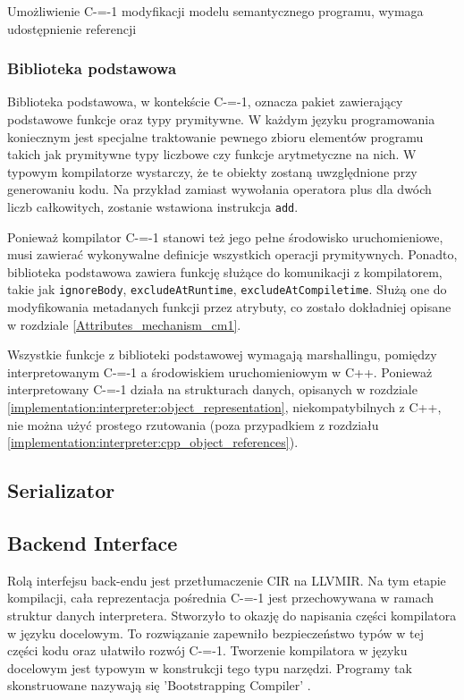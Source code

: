 Umożliwienie C-=-1 modyfikacji modelu semantycznego programu, wymaga udostępnienie referencji %

\subsubsection{Biblioteka podstawowa}
\label{implementation:interpreter:basic_library}

Biblioteka podstawowa, w kontekście C-=-1, oznacza pakiet zawierający podstawowe funkcje oraz typy prymitywne.
W każdym języku programowania koniecznym jest specjalne traktowanie pewnego zbioru elementów programu takich jak prymitywne typy liczbowe czy funkcje arytmetyczne na nich.
W typowym kompilatorze wystarczy, że te obiekty zostaną uwzględnione przy generowaniu kodu.
Na przykład zamiast wywołania operatora plus dla dwóch liczb całkowitych, zostanie wstawiona instrukcja \lstinline{add}.

Ponieważ kompilator C-=-1 stanowi też jego pełne środowisko uruchomieniowe, musi zawierać wykonywalne definicje wszystkich operacji prymitywnych.
Ponadto, biblioteka podstawowa zawiera funkcję służące do komunikacji z kompilatorem, takie jak \lstinline{ignoreBody}, \lstinline{excludeAtRuntime}, \lstinline{excludeAtCompiletime}.
Służą one do modyfikowania metadanych funkcji przez atrybuty, co zostało dokładniej opisane w rozdziale \ref{Attributes_mechanism_cm1}.

Wszystkie funkcje z biblioteki podstawowej wymagają marshallingu, pomiędzy interpretowanym C-=-1 a środowiskiem uruchomieniowym w C++.
Ponieważ interpretowany C-=-1 działa na strukturach danych, opisanych w rozdziale \ref{implementation:interpreter:object_representation}, niekompatybilnych z C++, nie można użyć prostego rzutowania (poza przypadkiem z rozdziału \ref{implementation:interpreter:cpp_object_references}).

\subsection{Serializator}
\label{serializer}

\subsection{Backend Interface}
\label{Backend_Interface}
Rolą interfejsu back-endu jest przetłumaczenie CIR na LLVMIR.
Na tym etapie kompilacji, cała reprezentacja pośrednia C-=-1 jest przechowywana w ramach struktur danych interpretera.
Stworzyło to okazję do napisania części kompilatora w języku docelowym.
To rozwiązanie zapewniło bezpieczeństwo typów w tej części kodu oraz ułatwiło rozwój C-=-1.
Tworzenie kompilatora w języku docelowym jest typowym w konstrukcji tego typu narzędzi.
Programy tak skonstruowane nazywają się 'Bootstrapping Compiler' \cite{puntambekar:compiler_design}. 

